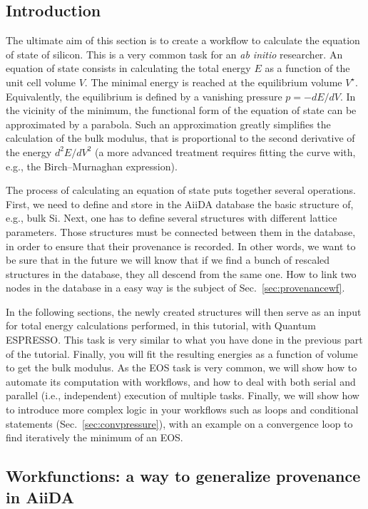 \subsection[Workfunctions]{Introduction}
The ultimate aim of this section is to create a workflow to calculate the equation of state of silicon. This is a very common task for an \textit{ab initio} researcher. An equation of state consists in calculating the total energy $E$ as a function of the unit cell volume $V$. The minimal energy is reached at the equilibrium volume $V^{\star}$. Equivalently, the equilibrium is defined by a vanishing pressure $p=-dE/dV$. In the vicinity of the minimum, the functional form of the equation of state can be approximated by a parabola. Such an approximation greatly simplifies the calculation of the bulk modulus, that is proportional to the second derivative of the energy $d^2E/dV^2$ (a more advanced treatment requires fitting the curve with, e.g., the Birch--Murnaghan expression).

The process of calculating an equation of state puts together several operations. 
First, we need to define and store in the AiiDA database the basic structure of, e.g., bulk Si.
Next, one has to define several structures with different lattice parameters. Those structures must be connected between them in the database, in order to ensure that their provenance is recorded. In other words, we want to be sure that in the future we will know that if we find a bunch of rescaled structures in the database, they all descend from the same one. How to link two nodes in the database in a easy way is the subject of Sec.~\ref{sec:provenancewf}.

In the following sections, the newly created structures will then serve as an input for total energy calculations performed, in this tutorial, with Quantum ESPRESSO. This task is very similar to what you have done in the previous part of the tutorial. Finally, you will fit the resulting energies as a function of volume to get the bulk modulus.
As the EOS task is very common, we will show how to automate its computation with workflows, and how to deal with both serial and parallel (i.e., independent) execution of multiple tasks. Finally, we will show how to introduce more complex logic in your workflows such as loops and conditional statements (Sec.~\ref{sec:convpressure}), with an example on a convergence loop to find iteratively the minimum of an EOS.


\subsection[Workfunctions]{\label{sec:provenancewf}Workfunctions: a way to generalize provenance in AiiDA}


